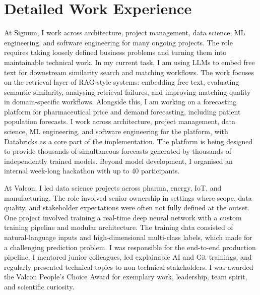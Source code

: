 \documentclass[11pt,a4paper]{moderncv}
\begin{document}
\newpage

\section{Detailed Work Experience}

\label{sec:signum}
 {
    At Signum, I work across architecture, project management, data science, ML engineering, and software engineering for many ongoing projects. The role requires taking loosely defined business problems and turning them into maintainable technical work.
    \newline\hspace*{2em}
    In my current task, I am using LLMs to embed free text for downstream similarity search and matching workflows. The work focuses on the retrieval layer of RAG-style systems: embedding free text, evaluating semantic similarity, analysing retrieval failures, and improving matching quality in domain-specific workflows.
    \newline\hspace*{2em}
    Alongside this, I am working on a forecasting platform for pharmaceutical price and demand forecasting, including patient population forecasts. I work across architecture, project management, data science, ML engineering, and software engineering for the platform, with Databricks as a core part of the implementation. The platform is being designed to provide thousands of simultaneous forecasts generated by thousands of independently trained models.
    \newline\hspace*{2em}
    Beyond model development, I organised an internal week-long hackathon with up to 40 participants.
}{}

\label{sec:valcon}
 {
    At Valcon, I led data science projects across pharma, energy, IoT, and manufacturing. The role involved senior ownership in settings where scope, data quality, and stakeholder expectations were often not fully defined at the outset.
    \newline\hspace*{2em}
    One project involved training a real-time deep neural network with a custom training pipeline and modular architecture. The training data consisted of natural-language inputs and high-dimensional multi-class labels, which made for a challenging prediction problem. I was responsible for the end-to-end production pipeline.
    \newline\hspace*{2em}
    I mentored junior colleagues, led explainable AI and Git trainings, and regularly presented technical topics to non-technical stakeholders. I was awarded the Valcon People's Choice Award for exemplary work, leadership, team spirit, and scientific curiosity.
}{}
\end{document}
